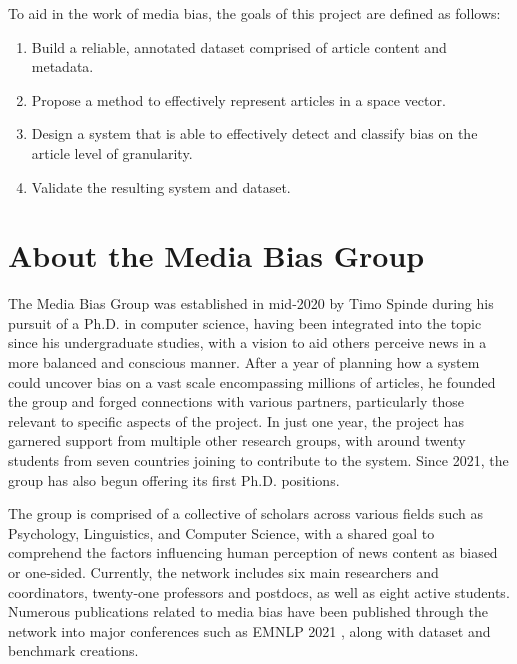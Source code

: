 To aid in the work of media bias, the goals of this project are defined as follows:
\begin{enumerate}
    \item Build a reliable, annotated dataset comprised of article content and metadata.
    \item Propose a method to effectively represent articles in a space vector.
    \item Design a system that is able to effectively detect and classify bias on the article level of granularity.
    \item Validate the resulting system and dataset.
\end{enumerate}

\section{About the Media Bias Group}

The Media Bias Group \cite{media-bias-group} was established in mid-2020 by Timo Spinde during his pursuit of a Ph.D. in computer science, having been integrated into the topic since his undergraduate studies, with a vision to aid others perceive news in a more balanced and conscious manner. After a year of planning how a system could uncover bias on a vast scale encompassing millions of articles, he founded the group and forged connections with various partners, particularly those relevant to specific aspects of the project. In just one year, the project has garnered support from multiple other research groups, with around twenty students from seven countries joining to contribute to the system. Since 2021, the group has also begun offering its first Ph.D. positions.

The group is comprised of a collective of scholars across various fields such as Psychology, Linguistics, and Computer Science, with a shared goal to comprehend the factors influencing human perception of news content as biased or one-sided. Currently, the network includes six main researchers and coordinators, twenty-one professors and postdocs, as well as eight active students. Numerous publications related to media bias have been published through the network into major conferences such as EMNLP 2021 \cite{spinde-2021-babe}, along with dataset and benchmark creations.


